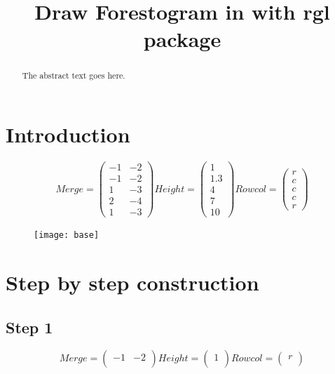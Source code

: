 \documentclass{article}
\begin{document}
\title{Draw Forestogram in with rgl package}
\maketitle

\begin{abstract}
The abstract text goes here.
\end{abstract}

\section{Introduction}



\begin{figure}[h]

\[
Merge =  \left(\begin{array}{cc}
-1 & -2 \\
-1 & -2 \\
 1 & -3 \\
 2 & -4 \\ 
 1 & -3 
\end{array} \right)
%
Height = \left( \begin{array}{c}
1 \\
1.3 \\
4 \\
7 \\
10 
\end{array} \right)
%
Rowcol = \left( \begin{array}{c}
r \\
c \\
c \\
c \\
r 
\end{array} \right)
\]  
\end{figure}

\begin{figure}[h]
\centering \texttt{[image: base]}
\end{figure}

\clearpage
\section{Step by step construction}



\raggedright\subsection{Step 1}
\[
Merge =  \left(\begin{array}{cc}
-1 & -2 \\
\end{array} \right)
%
Height = \left( \begin{array}{c}
1 \\
\end{array} \right)
%
Rowcol = \left( \begin{array}{c}
r \\
\end{array} \right)
\]  
\end{document}
